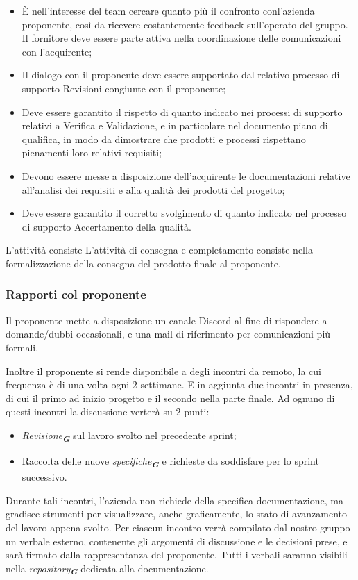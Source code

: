 \begin{enumerate}
\begin{itemize}
    \item È nell’interesse del team cercare quanto più il confronto conl’azienda proponente, così da ricevere costantemente feedback sull’operato del gruppo. Il fornitore deve essere parte attiva nella coordinazione delle comunicazioni con l’acquirente;
    \item Il dialogo con il proponente deve essere supportato dal relativo processo di supporto Revisioni congiunte con il proponente;
    \item Deve essere garantito il rispetto di quanto indicato nei processi di supporto relativi a Verifica e Validazione, e in particolare nel documento piano di qualifica, in modo da dimostrare che prodotti e processi rispettano pienamenti loro relativi requisiti;
    \item Devono essere messe a disposizione dell’acquirente le documentazioni relative all’analisi dei requisiti e alla qualità dei prodotti del progetto;
    \item Deve essere garantito il corretto svolgimento di quanto indicato nel processo di supporto Accertamento della qualità.
\end{itemize}
L'attività consiste L'attività di consegna e completamento consiste nella formalizzazione della consegna del prodotto finale al proponente.

\subsubsection{Rapporti col proponente}
Il proponente mette a disposizione un canale Discord al fine di rispondere a domande/dubbi occasionali, e una mail di riferimento per comunicazioni più formali.

Inoltre il proponente si rende disponibile a degli incontri da remoto, la cui frequenza è di una volta ogni 2 settimane.
E in aggiunta due incontri in presenza, di cui il primo ad inizio progetto e il secondo nella parte finale.
Ad ognuno di questi incontri la discussione verterà su 2 punti:
\begin{itemize}
    \item \emph{Revisione}\textsubscript{\textit{\textbf{G}}} sul lavoro svolto nel precedente sprint;
    \item Raccolta delle nuove \emph{specifiche}\textsubscript{\textit{\textbf{G}}} e richieste da soddisfare per lo sprint successivo.
\end{itemize}
Durante tali incontri, l’azienda non richiede della specifica documentazione, ma gradisce strumenti per visualizzare, anche graficamente, lo stato di avanzamento del lavoro appena svolto.
Per ciascun incontro verrà compilato dal nostro gruppo un verbale esterno, contenente gli argomenti di discussione e le decisioni prese, e sarà firmato dalla rappresentanza del proponente.
Tutti i verbali saranno visibili nella \emph{repository}\textsubscript{\textit{\textbf{G}}} dedicata alla documentazione.


\end{enumerate}
